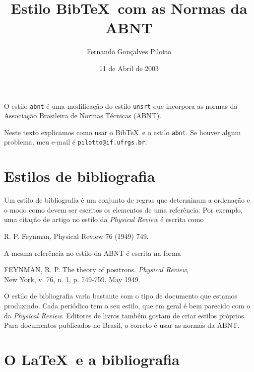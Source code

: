 \documentclass[a4paper,12pt]{article}
\newcommand{\ca}{\c{c}\~ao}
\begin{document}
\title{Estilo Bib\TeX\ com as Normas da ABNT}
\author{Fernando Gon\c{c}alves Pilotto} 
\date{11 de Abril de 2003}
\maketitle

O estilo \verb+abnt+ \'e uma modifica{\ca} do estilo \verb+unsrt+ que
incorpora as normas da Associa{\ca} Brasileira de Normas T\'ecnicas (ABNT).

Neste texto explicamos como usar o Bib\TeX\ e o estilo \verb+abnt+.
Se houver algum problema, meu e-mail \'e
\verb+pilotto@if.ufrgs.br+.


\tableofcontents

\newpage



\section{Estilos de bibliografia}


Um estilo de bibliografia \'e um conjunto de regras que determinam
a ordena{\ca} e o modo como devem ser escritos os elementos 
de uma refer\^encia. Por exemplo, uma cita{\ca} de artigo no estilo
da {\it Physical Review} \'e escrita como
\begin{center}
R. P. Feynman, Physical Review 76 (1949) 749.
\end{center}
A mesma refer\^encia no estilo da ABNT \'e escrita na forma
\begin{center}
\parbox{0.8\textwidth}{
FEYNMAN, R. P. The theory of positrons. {\it Physical Review}, \\
New York, v. 76, n. 1, p. 749-759, May 1949.}
\end{center}
O estilo de bibliografia varia bastante com o tipo de documento que
estamos produzindo.
Cada peri\'odico tem o seu estilo, que em geral \'e bem 
parecido com o da {\it Physical Review}. Editores de livros
tamb\'em gostam de criar estilos pr\'oprios. Para documentos
publicados no Brasil, o correto \'e usar as normas da ABNT.




\section{O \LaTeX\ e a bibliografia}
\end{document}
